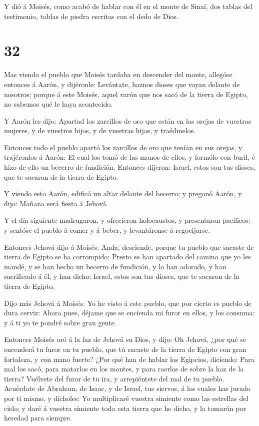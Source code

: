  Y dió á Moisés, como acabó de hablar con él en el monte de
Sinaí, dos tablas del testimonio, tablas de piedra escritas con el dedo
de Dios.

\hypertarget{section-31}{%
\section{32}\label{section-31}}

 Mas viendo el pueblo que Moisés tardaba en descender del
monte, allegóse entonces á Aarón, y dijéronle: Levántate, haznos dioses
que vayan delante de nosotros; porque á este Moisés, aquel varón que nos
sacó de la tierra de Egipto, no sabemos qué le haya acontecido.

 Y Aarón les dijo: Apartad los zarcillos de oro que están en
las orejas de vuestras mujeres, y de vuestros hijos, y de vuestras
hijas, y traédmelos.

 Entonces todo el pueblo apartó los zarcillos de oro que
tenían en sus orejas, y trajéronlos á Aarón:  El cual los
tomó de las manos de ellos, y formólo con buril, é hizo de ello un
becerro de fundición. Entonces dijeron: Israel, estos son tus dioses,
que te sacaron de la tierra de Egipto.

 Y viendo esto Aarón, edificó un altar delante del becerro;
y pregonó Aarón, y dijo: Mañana será fiesta á Jehová.

 Y el día siguiente madrugaron, y ofrecieron holocaustos, y
presentaron pacíficos: y sentóse el pueblo á comer y á beber, y
levantáronse á regocijarse.

 Entonces Jehová dijo á Moisés: Anda, desciende, porque tu
pueblo que sacaste de tierra de Egipto se ha corrompido: 
Presto se han apartado del camino que yo les mandé, y se han hecho un
becerro de fundición, y lo han adorado, y han sacrificado á él, y han
dicho: Israel, estos son tus dioses, que te sacaron de la tierra de
Egipto.

 Dijo más Jehová á Moisés: Yo he visto á este pueblo, que
por cierto es pueblo de dura cerviz:  Ahora pues, déjame
que se encienda mi furor en ellos, y los consuma: y á ti yo te pondré
sobre gran gente.

 Entonces Moisés oró á la faz de Jehová su Dios, y dijo: Oh
Jehová, ¿por qué se encenderá tu furor en tu pueblo, que tú sacaste de
la tierra de Egipto con gran fortaleza, y con mano fuerte? 
¿Por qué han de hablar los Egipcios, diciendo: Para mal los sacó, para
matarlos en los montes, y para raerlos de sobre la haz de la tierra?
Vuélvete del furor de tu ira, y arrepiéntete del mal de tu pueblo.
 Acuérdate de Abraham, de Isaac, y de Israel, tus siervos,
á los cuales has jurado por ti mismo, y dícholes: Yo multiplicaré
vuestra simiente como las estrellas del cielo; y daré á vuestra simiente
toda esta tierra que he dicho, y la tomarán por heredad para siempre.

